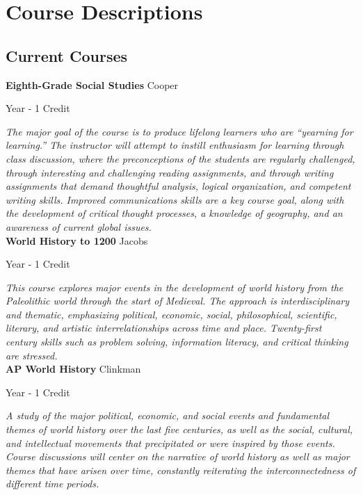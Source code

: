 \section{Course Descriptions}

\subsection{Current Courses}
\noindent\textbf{Eighth-Grade Social Studies} \hfill Cooper

\noindent Year - 1 Credit

\vspace{1mm}\emph{The major goal of the course is to produce lifelong learners who are “yearning for learning.”  The instructor will attempt to instill enthusiasm for learning through class discussion, where the preconceptions of the students are regularly challenged, through interesting and challenging reading assignments, and through writing assignments that demand thoughtful analysis, logical organization, and competent writing skills.  Improved communications skills are a key course goal, along with the development of critical thought processes, a knowledge of geography, and an awareness of current global issues.}\\

\noindent\textbf{World History to 1200} \hfill Jacobs

\noindent Year - 1 Credit

\vspace{1mm}\emph{This course explores major events in the development of world history from the Paleolithic world through the start of Medieval. The approach is interdisciplinary and thematic, emphasizing political, economic, social, philosophical, scientific, literary, and artistic interrelationships across time and place. Twenty-first century skills such as problem solving, information literacy, and critical thinking are stressed.}\\

\noindent\textbf{AP World History} \hfill Clinkman

\noindent Year - 1 Credit

\vspace{1mm}\emph{A study of the major political, economic, and social events and fundamental themes of world history over the last five centuries, as well as the social, cultural, and intellectual movements that precipitated or were inspired by those events. Course discussions will center on the narrative of world history as well as major themes that have arisen over time, constantly reiterating the interconnectedness of different time periods.}\\

